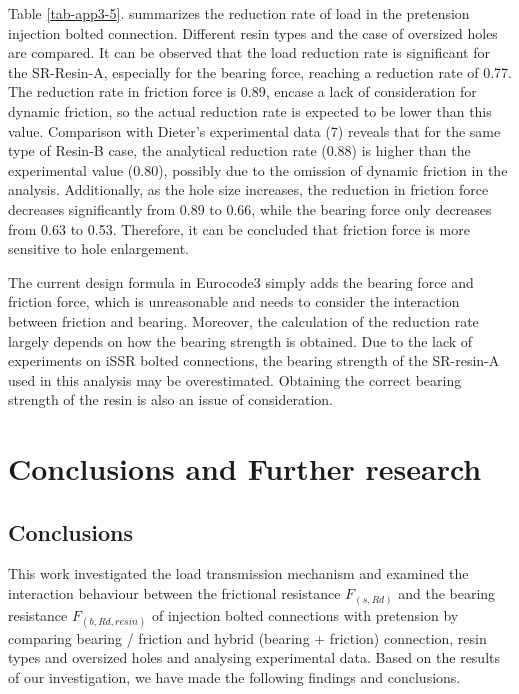 Table \ref{tab-app3-5}. summarizes the reduction rate of load in the pretension injection bolted connection. Different resin types and the case of oversized holes are compared. It can be observed that the load reduction rate is significant for the SR-Resin-A, especially for the bearing force, reaching a reduction rate of 0.77. The reduction rate in friction force is 0.89, encase a lack of consideration for dynamic friction, so the actual reduction rate is expected to be lower than this value. Comparison with Dieter's experimental data (7) reveals that for the same type of Resin-B case, the analytical reduction rate (0.88) is higher than the experimental value (0.80), possibly due to the omission of dynamic friction in the analysis. Additionally, as the hole size increases, the reduction in friction force decreases significantly from 0.89 to 0.66, while the bearing force only decreases from 0.63 to 0.53. Therefore, it can be concluded that friction force is more sensitive to hole enlargement.

The current design formula in Eurocode3 simply adds the bearing force and friction force, which is unreasonable and needs to consider the interaction between friction and bearing. Moreover, the calculation of the reduction rate largely depends on how the bearing strength is obtained. Due to the lack of experiments on iSSR bolted connections, the bearing strength of the SR-resin-A used in this analysis may be overestimated. Obtaining the correct bearing strength of the resin is also an issue of consideration.

\section{Conclusions and Further research}

\subsection{Conclusions}

This work investigated the load transmission mechanism and examined the interaction behaviour between the frictional resistance $F_{(s,Rd)}$ and the bearing resistance $F_{(b,Rd,resin)}$ of injection bolted connections with pretension by comparing bearing / friction and hybrid (bearing + friction) connection, resin types and oversized holes and analysing experimental data. Based on the results of our investigation, we have made the following findings and conclusions.

